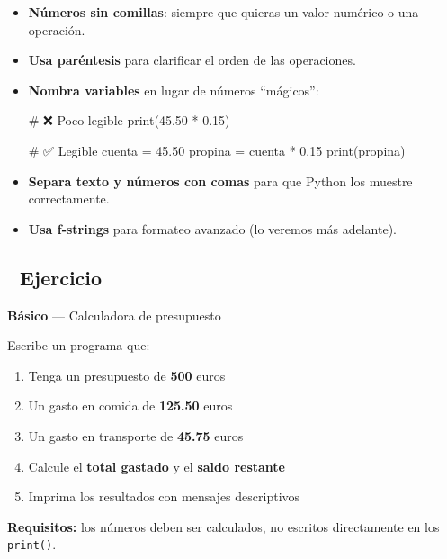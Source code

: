 \documentclass[
  doc,
  floatsintext,
  longtable,
  a4paper,
  nolmodern,
  notxfonts,
  notimes,
  12pt,
  colorlinks=true,linkcolor=blue,citecolor=blue,urlcolor=blue]{apa7}
\newenvironment{Shaded}{\begin{snugshade}}{\end{snugshade}}
\newcommand{\BuiltInTok}[1]{\textcolor[rgb]{0.00,0.23,0.31}{#1}}
\newcommand{\CommentTok}[1]{\textcolor[rgb]{0.37,0.37,0.37}{#1}}
\newcommand{\FloatTok}[1]{\textcolor[rgb]{0.68,0.00,0.00}{#1}}
\newcommand{\NormalTok}[1]{\textcolor[rgb]{0.00,0.23,0.31}{#1}}
\newcommand{\OperatorTok}[1]{\textcolor[rgb]{0.37,0.37,0.37}{#1}}
\providecommand{\tightlist}{%
  \setlength{\itemsep}{0pt}\setlength{\parskip}{0pt}}
\begin{document}
\begin{itemize}
\item
  \textbf{Números sin comillas}: siempre que quieras un valor numérico o
  una operación.
\item
  \textbf{Usa paréntesis} para clarificar el orden de las operaciones.
\item
  \textbf{Nombra variables} en lugar de números ``mágicos'':

\begin{Shaded}
\begin{Highlighting}[]
\CommentTok{\# ❌ Poco legible}
\BuiltInTok{print}\NormalTok{(}\FloatTok{45.50} \OperatorTok{*} \FloatTok{0.15}\NormalTok{)}

\CommentTok{\# ✅ Legible}
\NormalTok{cuenta }\OperatorTok{=} \FloatTok{45.50}
\NormalTok{propina }\OperatorTok{=}\NormalTok{ cuenta }\OperatorTok{*} \FloatTok{0.15}
\BuiltInTok{print}\NormalTok{(propina)}
\end{Highlighting}
\end{Shaded}
\item
  \textbf{Separa texto y números con comas} para que Python los muestre
  correctamente.
\item
  \textbf{Usa f-strings} para formateo avanzado (lo veremos más
  adelante).
\end{itemize}

\subsection{📝 Ejercicio}\label{ejercicio}

\textbf{Básico} --- Calculadora de presupuesto

Escribe un programa que:

\begin{enumerate}
\def\labelenumi{\arabic{enumi}.}
\tightlist
\item
  Tenga un presupuesto de \textbf{500} euros
\item
  Un gasto en comida de \textbf{125.50} euros
\item
  Un gasto en transporte de \textbf{45.75} euros
\item
  Calcule el \textbf{total gastado} y el \textbf{saldo restante}
\item
  Imprima los resultados con mensajes descriptivos
\end{enumerate}

\textbf{Requisitos:} los números deben ser calculados, no escritos
directamente en los \texttt{print()}.
\end{document}
